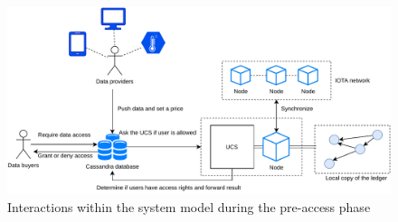 \begin{figure}[t]
\centering
\includegraphics[width=\textwidth]{Images/system_model.pdf}
\caption{Interactions within the system model during the pre-access phase}
\label{F_system_model}
\end{figure}

